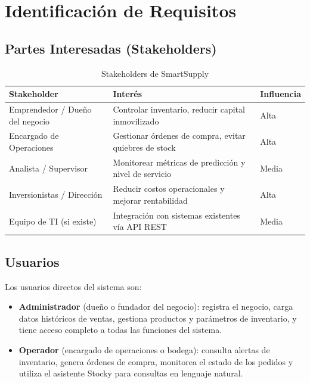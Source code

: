 \documentclass[12pt, a4paper]{report}
\begin{document}
\chapter{Identificación de Requisitos}

\section{Partes Interesadas (Stakeholders)}

\begin{table}[H]
  \centering
  \caption{Stakeholders de SmartSupply}
  \label{tab:stakeholders}
  \begin{tabular}{|l|l|l|}
    \hline
    \textbf{Stakeholder} & \textbf{Interés} & \textbf{Influencia} \\
    \hline
    Emprendedor / Dueño del negocio & Controlar inventario, reducir capital inmovilizado & Alta \\
    Encargado de Operaciones        & Gestionar órdenes de compra, evitar quiebres de stock & Alta \\
    Analista / Supervisor           & Monitorear métricas de predicción y nivel de servicio & Media \\
    Inversionistas / Dirección      & Reducir costos operacionales y mejorar rentabilidad   & Alta \\
    Equipo de TI (si existe)        & Integración con sistemas existentes vía API REST       & Media \\
    \hline
  \end{tabular}
\end{table}

\section{Usuarios}

Los usuarios directos del sistema son:

\begin{itemize}
  \item \textbf{Administrador} (dueño o fundador del negocio): registra el negocio,
        carga datos históricos de ventas, gestiona productos y parámetros de inventario,
        y tiene acceso completo a todas las funciones del sistema.
  \item \textbf{Operador} (encargado de operaciones o bodega): consulta alertas de
        inventario, genera órdenes de compra, monitorea el estado de los pedidos y
        utiliza el asistente Stocky para consultas en lenguaje natural.
\end{itemize}
\end{document}
